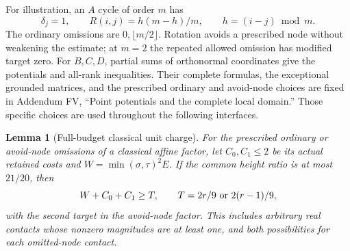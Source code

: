 \documentclass[11pt]{article}
\newtheorem{lemma}[theorem]{Lemma}
\theoremstyle{remark}\newtheorem{remark}[theorem]{Remark}
\numberwithin{equation}{section}
\begin{document}
For illustration, an $A$ cycle of order $m$ has
\[
 \delta_j=1,\qquad
 R(i,j)=h(m-h)/m,\qquad h=(i-j)\bmod m.
\]
The ordinary omissions are $0,\lfloor m/2\rfloor$. Rotation
avoids a prescribed node without weakening the estimate; at
$m=2$ the repeated allowed omission has modified target zero.
For $B,C,D$, partial sums of orthonormal coordinates give the
potentials and all-rank inequalities. Their complete formulas,
the exceptional grounded matrices, and the prescribed ordinary
and avoid-node choices are fixed in Addendum FV, ``Point potentials
and the complete local domain.'' Those specific choices are used
throughout the following interfaces.

\begin{lemma}[Full-budget classical unit charge]
\label{fv:lem:full-budget-classical-unit}
For the prescribed ordinary or avoid-node omissions of a classical
affine factor, let $C_0,C_1\le2$ be its actual retained costs and
$W=\min(\sigma,\tau)^2E$. If the common height ratio is at most
$21/20$, then
\[
 W+C_0+C_1\ge T,
 \qquad T=2r/9\ \hbox{or}\ 2(r-1)/9,
\]
with the second target in the avoid-node factor. This includes
arbitrary real contacts whose nonzero magnitudes are at least one,
and both possibilities for each omitted-node contact.
\end{lemma}
\end{document}
